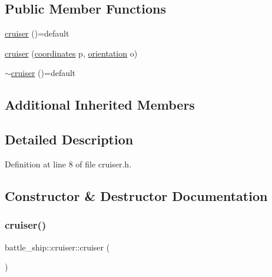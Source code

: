 \subsection*{Public Member Functions}
\begin{DoxyCompactItemize}
\item 
\hyperlink{classbattle__ship_1_1cruiser_aa8fad74fb5caf3fd0cec5429b97fb46a}{cruiser} ()=default
\item 
\hyperlink{classbattle__ship_1_1cruiser_a3460b4b49152a6653122e30224114115}{cruiser} (\hyperlink{structbattle__ship_1_1coordinates}{coordinates} p, \hyperlink{namespacebattle__ship_aed87488f0a73f0d0679fe343fb61c784}{orientation} o)
\item 
\hyperlink{classbattle__ship_1_1cruiser_a78e3074b6331c963a2ba3200a14a85c3}{$\sim$cruiser} ()=default
\end{DoxyCompactItemize}
\subsection*{Additional Inherited Members}


\subsection{Detailed Description}


Definition at line 8 of file cruiser.\+h.



\subsection{Constructor \& Destructor Documentation}
\mbox{\label{classbattle__ship_1_1cruiser_aa8fad74fb5caf3fd0cec5429b97fb46a}} 
\subsubsection{\texorpdfstring{cruiser()}{cruiser()}\hspace{0.1cm}{\footnotesize\ttfamily [1/2]}}
{\footnotesize\ttfamily battle\+\_\+ship\+::cruiser\+::cruiser (\begin{DoxyParamCaption}{ }\end{DoxyParamCaption})\hspace{0.3cm}{\ttfamily [default]}}

